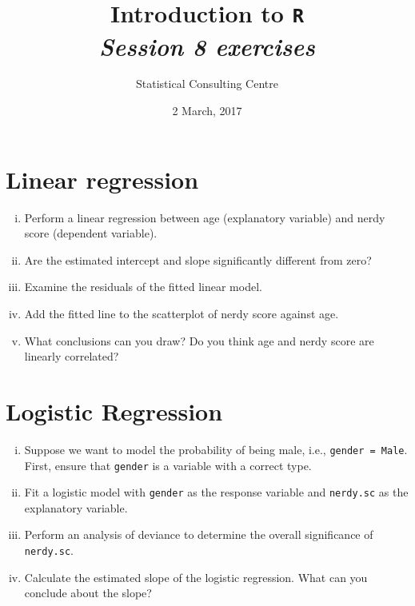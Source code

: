 \documentclass[12pt,a4paper]{article}\usepackage[]{graphicx}\usepackage[]{color}
\begin{document}
\setlength\parindent{0cm}
\title{\Large{\textbf{Introduction to \texttt{R}}}\\
\textit{Session 8 exercises}}
\author{Statistical Consulting Centre}
\date{2 March, 2017}
\maketitle
 
 


\section{Linear regression} 
\label{sec:lm}
\begin{enumerate}[(i)]
\item Perform a linear regression between age (explanatory variable) and nerdy score (dependent variable).

\item Are the estimated intercept and slope significantly different from zero?

\item Examine the residuals of the fitted linear model.

\item Add the fitted line to the scatterplot of nerdy score against age.

\item What conclusions can you draw? Do you think age and nerdy score are linearly correlated?
\end{enumerate}


\section{Logistic Regression} 
\label{sec:log}
\begin{enumerate}[(i)]

\subsection{Continuous explanatory variable}

\item Suppose we want to model the probability of being male, i.e., \texttt{gender = Male}. First, ensure that \texttt{gender} is a variable with a correct type. 

\item Fit a logistic model with \texttt{gender} as the response variable and \texttt{nerdy.sc} as the explanatory variable.

\item Perform an analysis of deviance to determine the overall significance of \texttt{nerdy.sc}.

\item Calculate the estimated slope of the logistic regression. What can you conclude about the slope?

\end{enumerate}
\end{document}
